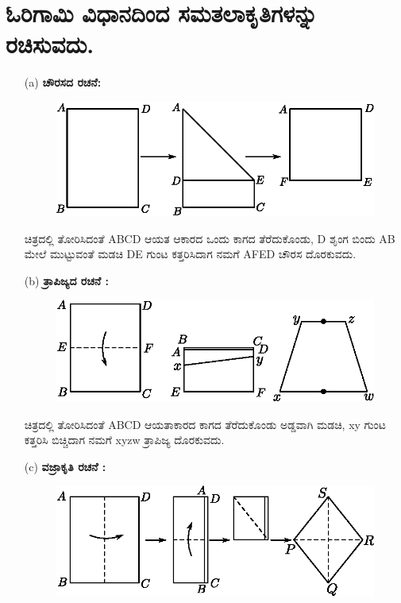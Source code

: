 \section{ಓರಿಗಾಮಿ ವಿಧಾನದಿಂದ ಸಮತಲಾಕೃತಿಗಳನ್ನು ರಚಿಸುವದು.}\label{sec1.9} %
\begin{itemize}
\item[(a)] \textbf{ಚೌರಸದ ರಚನೆ:}
\begin{figure}[H]
\centering
\includegraphics[scale=.98]{src/figure/chap1/fig1-15a.eps}
\end{figure}

ಚಿತ್ರದಲ್ಲಿ ತೋರಿಸಿದಂತೆ ABCD ಆಯತ ಆಕಾರದ ಒಂದು ಕಾಗದ ತೆರೆದುಕೊಂಡು, D ಶೃಂಗ ಬಿಂದು AB ಮೇಲೆ ಮುಟ್ಟುವಂತೆ ಮಡಚಿ DE ಗುಂಟ ಕತ್ತರಿಸಿದಾಗ ನಮಗೆ  AFED ಚೌರಸ ದೊರಕುವದು. 


\item[(b)] \textbf{ತ್ರಾಪಿಜ್ಯದ ರಚನೆ :}
\begin{figure}[H]
\centering
\includegraphics[scale=.98]{src/figure/chap1/fig1-15b.eps}
\end{figure}

ಚಿತ್ರದಲ್ಲಿ ತೋರಿಸಿದಂತೆ ABCD ಆಯತಾಕಾರದ ಕಾಗದ ತೆರೆದುಕೊಂಡು ಅಡ್ಡವಾಗಿ ಮಡಚಿ, xy ಗುಂಟ ಕತ್ತರಿಸಿ ಬಿಚ್ಚಿದಾಗ ನಮಗೆ xyzw ತ್ರಾಪಿಜ್ಯ ದೊರಕುವದು. 

\item[(c)] \textbf{ವಜ್ರಾಕೃತಿ ರಚನೆ :}
\begin{figure}[H]
\centering
\includegraphics[scale=.98]{src/figure/chap1/fig1-15c.eps}
\end{figure}


\end{itemize}
